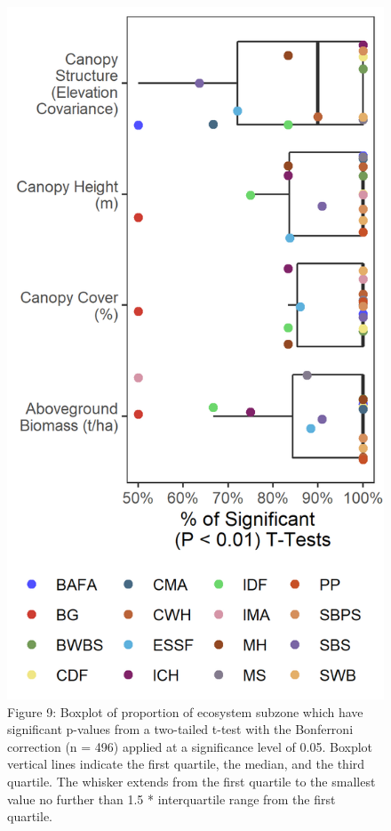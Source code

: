 \documentclass[10pt,oneside]{article}
\makeatletter
\def\maxwidth{\ifdim\Gin@nat@width>\linewidth\linewidth
\else\Gin@nat@width\fi}
\let\Oldincludegraphics\includegraphics
\renewcommand{\includegraphics}[1]{\Oldincludegraphics[width=\maxwidth]{#1}}
\makeatother
\begin{document}
\begin{figure}
\hypertarget{fig:t-test-plot}{%
\centering
\includegraphics{figures/t_tests_scatter.png}
\caption{Figure 9: Boxplot of proportion of ecosystem subzone which have
significant p-values from a two-tailed t-test with the Bonferroni
correction (n = 496) applied at a significance level of 0.05. Boxplot
vertical lines indicate the first quartile, the median, and the third
quartile. The whisker extends from the first quartile to the smallest
value no further than 1.5 * interquartile range from the first
quartile.}\label{fig:t-test-plot}
}
\end{figure}
\end{document}
